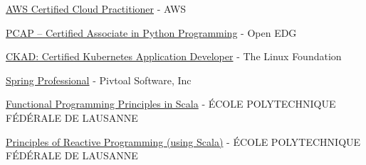 \begin{cvitems}
\sectionspace
\sectionspace
\vspace{1mm}
	\fontsize{11pt}{1.4em}\bodyfontlight\upshape\color{text}
        \item {\href{https://www.credly.com/badges/8ada78b1-3814-4e18-8723-dca6d69c1092/public_url}{AWS Certified Cloud Practitioner}} - {AWS}
        \item {\href{https://verify.openedg.org/?id=Kj33.9QB1.1saR}{PCAP – Certified Associate in Python Programming}} - {Open EDG}
        \item {\href{https://www.credly.com/badges/63392815-d840-4d5e-943d-13a257e0b875}{CKAD: Certified Kubernetes Application Developer}} - {The Linux Foundation}
        \item {\href{https://bcert.me/spurmtics}{Spring Professional}} - {Pivtoal Software, Inc}
        \item {\href{https://www.coursera.org/account/accomplishments/certificate/QYMUQ6M5KS}{Functional Programming Principles in Scala}} - {ÉCOLE POLYTECHNIQUE FÉDÉRALE DE LAUSANNE}
        \item {\href{https://www.coursera.org/account/accomplishments/verify/263CALSP9A}{Principles of Reactive Programming (using Scala)}} - {ÉCOLE POLYTECHNIQUE FÉDÉRALE DE LAUSANNE}
    \end{cvitems}
\vspace{1mm}
\sectionspace